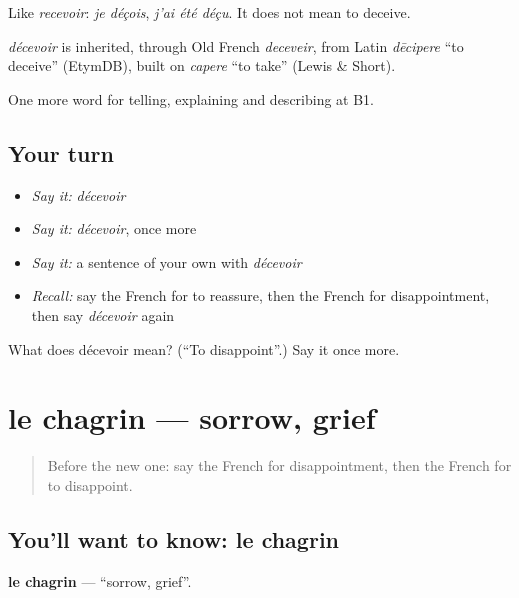 Like \emph{recevoir}: \emph{je déçois}, \emph{j'ai été déçu}. It does not mean to deceive.

\begin{cousinweb}
\emph{décevoir} is inherited, through Old French \emph{deceveir}, from Latin \emph{dēcipere} \textquotedblleft{}to deceive\textquotedblright{} (EtymDB), built on \emph{capere} \textquotedblleft{}to take\textquotedblright{} (Lewis \& Short).
\end{cousinweb}

\begin{grammarlens}[title={What you've built}]
One more word for telling, explaining and describing at B1.
\end{grammarlens}

\subsection*{Your turn}
\begin{itemize}
\raggedright
  \item \emph{Say it:} \emph{décevoir}
  \item \emph{Say it:} \emph{décevoir}, once more
  \item \emph{Say it:} a sentence of your own with \emph{décevoir}
  \item \emph{Recall:} say the French for to reassure, then the French for disappointment, then say \emph{décevoir} again
\end{itemize}

\begin{tcolorbox}[breakable,colback=teal!4,colframe=teal!35!black,title={Before you move on}]
What does décevoir mean? (\textquotedblleft{}To disappoint\textquotedblright{}.) Say it once more.
\end{tcolorbox}
\section[le chagrin]{le chagrin — sorrow, grief}

\label{lesson:FR-C471-chagrin}



\begin{quote}
Before the new one: say the French for disappointment, then the French for to disappoint.
\end{quote}

\subsection*{You'll want to know: le chagrin}
\textbf{le chagrin} — \textquotedblleft{}sorrow, grief\textquotedblright{}.

